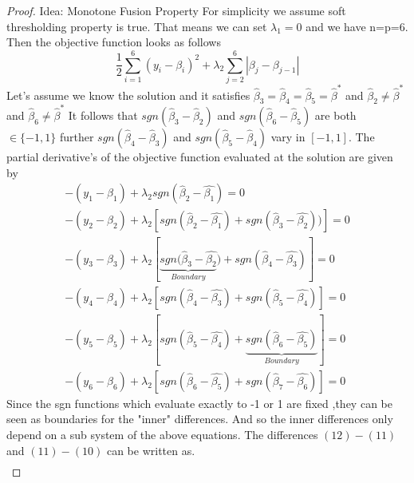 \documentclass{article}
\theoremstyle{definition}
\begin{document}
\begin{proof} Idea: Monotone Fusion Property \citep{friedman2007pathwise}
For simplicity we assume soft thresholding property is true. That means we can set $\lambda_1=0$ and we have n=p=6. Then the objective function looks as follows
\begin{equation}
\frac{1}{2}  \sum_{i=1}^{6}(y_{i}-\beta_i)^2+ \lambda_2 \sum_{j=2}^6|\beta_j- \beta_{j-1} |
\end{equation}
Let's assume we know the solution and it satisfies $\hat{\beta}_3=\hat{\beta}_4=\hat{\beta}_5=\hat{\beta}^*$ and $\hat{\beta}_2\neq\hat{\beta}^*$ and $\hat{\beta}_6\neq\hat{\beta}^*$ It follows that $sgn(\hat{\beta}_3-\hat{\beta}_2)$ and $sgn(\hat{\beta}_6-\hat{\beta}_5)$ are both $\in \{-1,1\}$ further $sgn(\hat{\beta}_4-\hat{\beta}_3)$ and $sgn(\hat{\beta}_5-\hat{\beta}_4)$ vary in $[-1,1]$. The partial derivative's of the objective function evaluated at the solution are given by
\begin{align}
-(y_1-\hat{\beta}_1)+\lambda_2 sgn(\hat{\beta}_2-\hat{\beta_1})=0 \\
-(y_2-\hat{\beta}_2)+\lambda_2 [sgn(\hat{\beta}_2-\hat{\beta_1})+sgn(\hat{\beta}_3-\hat{\beta_2}))]=0 \\
-(y_3-\hat{\beta}_3)+\lambda_2 [\underbrace{sgn(\hat{\beta}_3-\hat{\beta_2}}_{Boundary})+sgn(\hat{\beta}_4-\hat{\beta_3})]=0 \\
-(y_4-\hat{\beta}_4)+\lambda_2 [sgn(\hat{\beta}_4-\hat{\beta_3})+sgn(\hat{\beta}_5-\hat{\beta_4})]=0 \\
-(y_5-\hat{\beta}_5)+\lambda_2 [sgn(\hat{\beta}_5-\hat{\beta_4})+\underbrace{sgn(\hat{\beta}_6-\hat{\beta_5})}_{Boundary}]=0 \\
-(y_6-\hat{\beta}_6)+\lambda_2 [sgn(\hat{\beta}_6-\hat{\beta_5})+sgn(\hat{\beta}_7-\hat{\beta_6})]=0 
\end{align}
Since the sgn functions which evaluate exactly to -1 or 1 are fixed ,they can be seen as boundaries for the "inner" differences. And so the inner differences only depend on  a sub system of the above equations. The differences $(12)-(11)$ and $(11)-(10)$ can be written as. 
\begin{align}

\end{align}
\end{proof}
\end{document}
